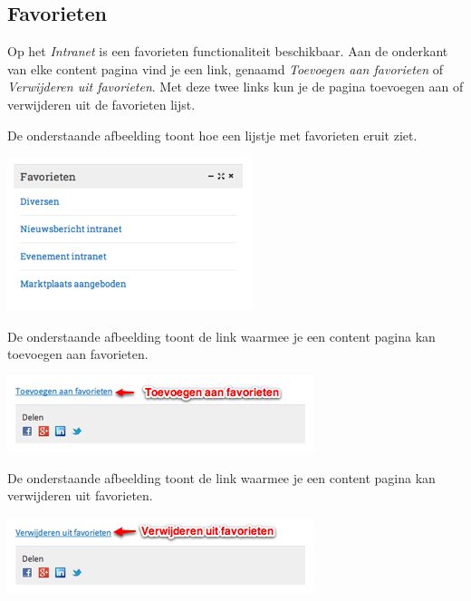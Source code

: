 \subsection{Favorieten}\label{favorieten}
Op het \emph{Intranet} is een favorieten functionaliteit beschikbaar. Aan de onderkant van elke content pagina vind je een link, genaamd \emph{Toevoegen aan favorieten} of \emph{Verwijderen uit favorieten}. Met deze twee links kun je de pagina toevoegen aan of verwijderen uit de favorieten lijst.

De onderstaande afbeelding toont hoe een lijstje met favorieten eruit ziet.

\begin{center}
	\includegraphics[width=\textwidth]{img/favorieten1}
\end{center}

De onderstaande afbeelding toont de link waarmee je een content pagina kan toevoegen aan favorieten.

\begin{center}
	\includegraphics[width=\textwidth]{img/favorieten2}
\end{center}

De onderstaande afbeelding toont de link waarmee je een content pagina kan verwijderen uit favorieten.

\begin{center}
	\includegraphics[width=\textwidth]{img/favorieten3}
\end{center}